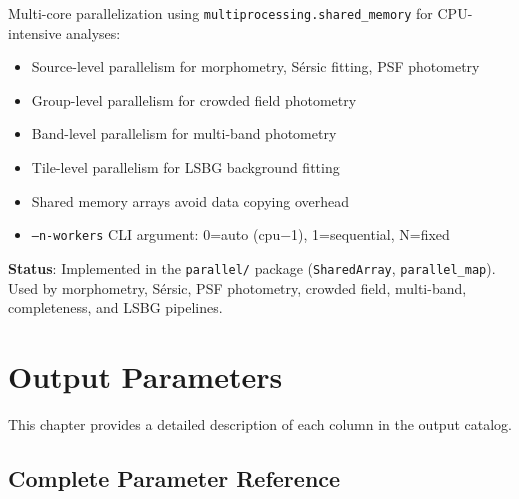 \documentclass[11pt,fleqn]{book}
\begin{document}
Multi-core parallelization using \texttt{multiprocessing.shared\_memory} for CPU-intensive analyses:
\begin{itemize}[leftmargin=2em]
  \item Source-level parallelism for morphometry, S\'ersic fitting, PSF photometry
  \item Group-level parallelism for crowded field photometry
  \item Band-level parallelism for multi-band photometry
  \item Tile-level parallelism for LSBG background fitting
  \item Shared memory arrays avoid data copying overhead
  \item \texttt{--n-workers} CLI argument: 0=auto (cpu$-$1), 1=sequential, N=fixed
\end{itemize}

\textbf{Status}: Implemented in the \texttt{parallel/} package (\texttt{SharedArray}, \texttt{parallel\_map}). Used by morphometry, S\'ersic, PSF photometry, crowded field, multi-band, completeness, and LSBG pipelines.


\chapter{Output Parameters}
\label{ch:parameters}

This chapter provides a detailed description of each column in the output catalog.

\section{Complete Parameter Reference}
\end{document}
